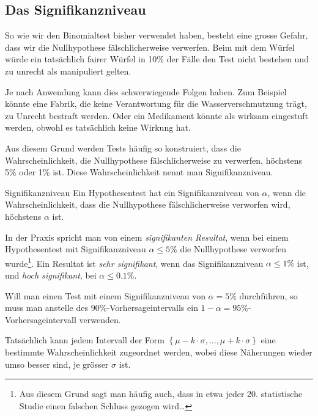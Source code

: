 \subsection{Das Signifikanzniveau}

So wie wir den Binomialtest bisher verwendet haben, besteht eine grosse Gefahr, dass wir die Nullhypothese fälschlicherweise verwerfen. Beim  mit dem Würfel würde ein tatsächlich fairer Würfel in 10\% der Fälle den Test nicht bestehen und zu unrecht als manipuliert gelten.

Je nach Anwendung kann dies schwerwiegende Folgen haben. Zum Beispiel könnte eine Fabrik, die keine Verantwortung für die Wasserverschmutzung trägt, zu Unrecht bestraft werden. Oder ein Medikament könnte als wirksam eingestuft werden, obwohl es tatsächlich keine Wirkung hat.

Aus diesem Grund werden Tests häufig so konstruiert, dass die Wahrscheinlichkeit, die Nullhypothese fälschlicherweise zu verwerfen, höchstens 5\% oder 1\% ist. Diese Wahrscheinlichkeit nennt man Signifikanzniveau.

\begin{definition}
    {Signifikanzniveau}{}
    Ein Hypothesentest hat ein Signifikanzniveau von \( \alpha \), wenn die Wahrscheinlichkeit, dass die Nullhypothese fälschlicherweise verworfen wird, höchstens \( \alpha \) ist.
\end{definition}

In der Praxis spricht man von einem \textit{signifikanten Resultat}, wenn bei einem Hypothesentest mit Signifikanzniveau \(\alpha \le 5\%\) die Nullhypothese verworfen wurde\footnote{Aus diesem Grund sagt man häufig auch, dass in etwa jeder 20. statistische Studie einen falschen Schluss gezogen wird\dots}. Ein Resultat ist \textit{sehr signifikant}, wenn das Signifikanzniveau \(\alpha \le 1\%\) ist, und  \textit{hoch signifikant}, bei \(\alpha \le 0.1\%\).

Will man einen Test mit einem Signifikanzniveau von \(\alpha=5\%\) durchführen, so muss man anstelle des 90\%-Vorhersageintervalls ein \(1-\alpha=95\%\)-Vorhersageintervall verwenden.

Tatsächlich kann jedem Intervall der Form \(\left\{\mu-k\cdot\sigma, \dots , \mu + k\cdot\sigma\right\}\) eine bestimmte Wahrscheinlichkeit zugeordnet werden, wobei diese Näherungen wieder umso besser sind, je grösser \(\sigma\) ist.

